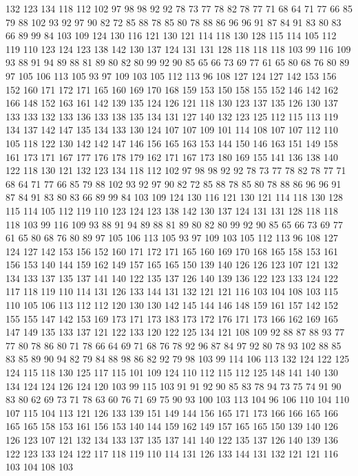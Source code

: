 132 123 134 118 112 102 97 98 98 92 92 78 73 77 78 82 78 77 71 68
64 71 77 66 85 79 88 102 93 92 97 90 82 72 85 88 78 85 80 78
88 86 96 96 91 87 84 91 83 80 83 66 89 99 84 103 109 124 130 116
121 130 121 114 118 130 128 115 114 105 112 119 110 123 124 123 138 142 130 137
124 131 131 128 118 118 118 103 99 116 109 93 88 91 94 89 88 81 89 80
82 80 99 92 90 85 65 66 73 69 77 61 65 80 68 76 80 89 97 105
106 113 105 93 97 109 103 105 112 113 96 108 127 124 127 142 153 156 152 160
171 172 171 165 160 169 170 168 159 153 150 158 155 152 146 142 162 166 148 152
163 161 142 139 135 124 126 121 118 130 123 137 135 126 130 137 133 133 132 133
136 133 138 135 134 131 127 140 132 123 125 112 115 113 119 134 137 142 147 135
134 133 130 124 107 107 109 101 114 108 107 107 112 110 105 118 122 130 142 142
147 146 156 165 163 153 144 150 146 163 151 149 158 161 173 171 167 177 176 178
179 162 171 167 173 180 169 155 141 136 138 140 122 118 130 121 132 123 134 118
112 102 97 98 98 92 92 78 73 77 78 82 78 77 71 68 64 71 77 66
85 79 88 102 93 92 97 90 82 72 85 88 78 85 80 78 88 86 96 96
91 87 84 91 83 80 83 66 89 99 84 103 109 124 130 116 121 130 121 114
118 130 128 115 114 105 112 119 110 123 124 123 138 142 130 137 124 131 131 128
118 118 118 103 99 116 109 93 88 91 94 89 88 81 89 80 82 80 99 92
90 85 65 66 73 69 77 61 65 80 68 76 80 89 97 105 106 113 105 93
97 109 103 105 112 113 96 108 127 124 127 142 153 156 152 160 171 172 171 165
160 169 170 168 165 158 153 161 156 153 140 144 159 162 149 157 165 165 150 139
140 126 126 123 107 121 132 134 133 137 135 137 141 140 122 135 137 126 140 139
136 122 123 133 124 122 117 118 119 110 114 131 126 133 144 131 132 121 121 116
103 104 108 103 115 110 105 106 113 112 112 120 130 130 142 145 144 146 148 159
161 157 142 152 155 155 147 142 153 169 173 171 173 183 173 172 176 171 173 166
162 169 165 147 149 135 133 137 121 122 133 120 122 125 134 121 108 109 92 88
87 88 93 77 77 80 78 86 80 71 78 66 64 69 71 68 76 78 92 96
87 84 97 92 80 78 93 102 88 85 83 85 89 90 94 82 79 84 88 98
86 82 92 79 98 103 99 114 106 113 132 124 122 125 124 115 118 130 125 117
115 101 109 124 110 112 115 112 125 148 141 140 130 134 124 124 126 124 120 103
99 115 103 91 91 92 90 85 83 78 94 73 75 74 91 90 83 80 62 69
73 71 78 63 60 76 71 69 75 90 93 100 103 113 104 96 106 110 104 110
107 115 104 113 121 126 133 139 151 149 144 156 165 171 173 166 166 165 166 165
165 158 153 161 156 153 140 144 159 162 149 157 165 165 150 139 140 126 126 123
107 121 132 134 133 137 135 137 141 140 122 135 137 126 140 139 136 122 123 133
124 122 117 118 119 110 114 131 126 133 144 131 132 121 121 116 103 104 108 103
